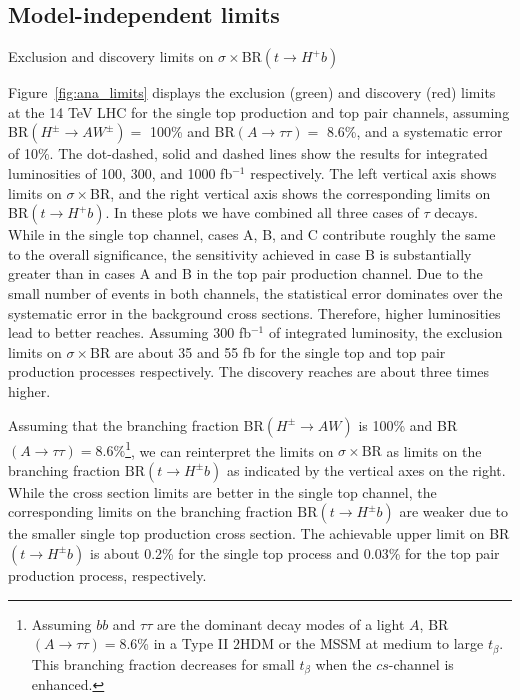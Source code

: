 \subsection{Model-independent limits}\label{subsec:ana_limits}

\begin{marginfigure}[-4.5in]
  \caption{Exclusion and discovery limits on $\sigma\times$BR$(t\rightarrow H^+b)$}
  \label{fig:ana_limits}
\end{marginfigure}

Figure~\ref{fig:ana_limits} displays the exclusion (green) and discovery (red) limits at the 14 TeV LHC for the single top production and top pair channels, assuming BR$(H^\pm\rightarrow AW^\pm) =$ 100\% and BR$(A\rightarrow\tau\tau) =$ 8.6\%, and a systematic error of 10\%. The dot-dashed, solid and dashed lines show the results for integrated luminosities of 100, 300, and 1000 fb$^{-1}$ respectively. The left vertical axis shows limits on $\sigma\times$BR, and the right vertical axis shows the corresponding limits on BR$(t\rightarrow H^+ b)$. In these plots we have combined all three cases of $\tau$ decays. While in the single top channel, cases A, B, and C contribute roughly the same to the overall significance, the sensitivity achieved in case B is substantially greater than in cases A and B in the top pair production channel. Due to the small number of events in both channels, the statistical error dominates over the systematic error in the background cross sections. Therefore, higher luminosities lead to better reaches. Assuming 300 fb$^{-1}$ of integrated luminosity, the exclusion limits on $\sigma\times\text{BR}$ are about 35 and 55 fb for the single top and top pair production processes respectively. The discovery reaches are about three times higher. 

Assuming that the branching fraction BR$(H^{\pm} \rightarrow A W )$ is 100\% and BR$(A \rightarrow \tau\tau)=8.6\%$\footnote{Assuming $bb$ and $\tau\tau$ are the dominant decay modes of a light $A$, BR$(A \rightarrow \tau\tau)=8.6$\% in a Type II $2$HDM or the MSSM at medium to large $t_{\beta}$. This branching fraction decreases for small $t_{\beta}$ when the $cs$-channel is enhanced.}, we can reinterpret the limits on $\sigma\times\text{BR}$ as limits on the branching fraction $\text{BR}(t \rightarrow H^{\pm} b)$ as indicated by the vertical axes on the right. While the cross section limits are better in the single top channel, the corresponding limits on the branching fraction $\text{BR}(t \rightarrow H^{\pm} b)$ are weaker due to the smaller single top production cross section. The achievable upper limit on BR$(t \rightarrow H^{\pm} b)$ is about 0.2\% for the single top process and 0.03\% for the top pair production process, respectively.

